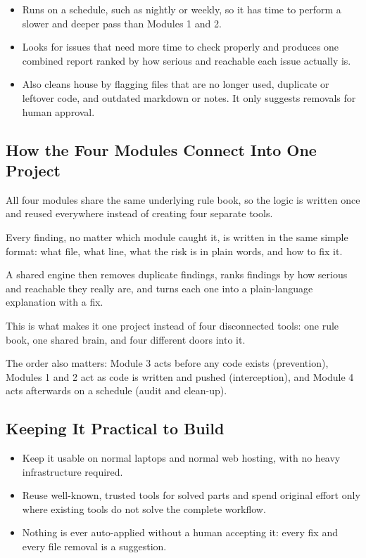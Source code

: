 \documentclass[11pt,a4paper]{article}
\begin{document}
\begin{itemize}[leftmargin=0.7cm]

    \item Runs on a schedule, such as nightly or weekly, so it has time to perform a slower and deeper pass than Modules 1 and 2.

    \item Looks for issues that need more time to check properly and produces one combined report ranked by how serious and reachable each issue actually is.

    \item Also cleans house by flagging files that are no longer used, duplicate or leftover code, and outdated markdown or notes. It only suggests removals for human approval.

\end{itemize}

\subsection{How the Four Modules Connect Into One Project}

All four modules share the same underlying rule book, so the logic is written once and reused everywhere instead of creating four separate tools.

Every finding, no matter which module caught it, is written in the same simple format: what file, what line, what the risk is in plain words, and how to fix it.

A shared engine then removes duplicate findings, ranks findings by how serious and reachable they really are, and turns each one into a plain-language explanation with a fix.

This is what makes it one project instead of four disconnected tools: one rule book, one shared brain, and four different doors into it.

The order also matters: Module 3 acts before any code exists (prevention), Modules 1 and 2 act as code is written and pushed (interception), and Module 4 acts afterwards on a schedule (audit and clean-up).

\subsection{Keeping It Practical to Build}

\begin{itemize}[leftmargin=0.7cm]

    \item Keep it usable on normal laptops and normal web hosting, with no heavy infrastructure required.

    \item Reuse well-known, trusted tools for solved parts and spend original effort only where existing tools do not solve the complete workflow.

    \item Nothing is ever auto-applied without a human accepting it: every fix and every file removal is a suggestion.

\end{itemize}
\end{document}
